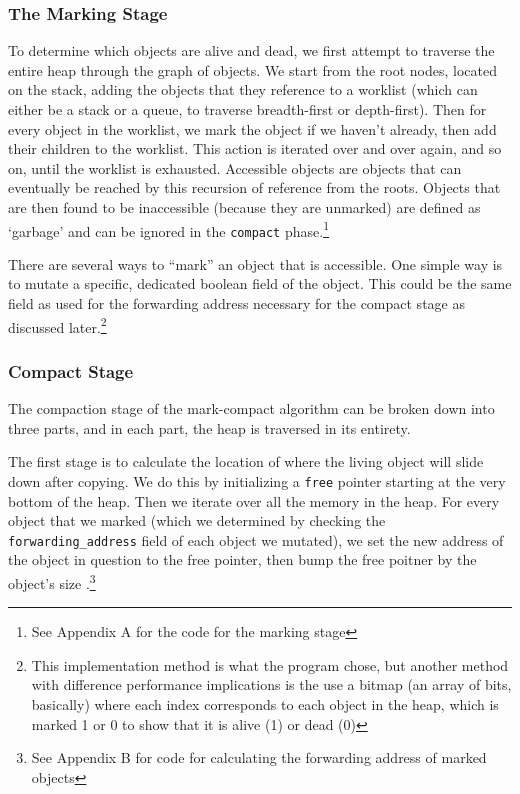\documentclass[index]{subfiles}
\begin{document}
\subsubsection{The Marking Stage}

To determine which objects are alive and dead, we first attempt to traverse the entire heap through the graph of objects. We start from the root nodes, located on the stack\cites[Ch~3~Marking]{redhat_openjdk}[Chapter~3]{gc_handbook}, adding the objects that they reference to a worklist (which can either be a stack or a queue, to traverse breadth-first or depth-first). Then for every object in the worklist, we mark the object if we haven't already, then add their children to the worklist. This action is iterated over and over again, and so on, until the worklist is exhausted. Accessible objects are objects that can eventually be reached by this recursion of reference from the roots. Objects that are then found to be inaccessible (because they are unmarked) are defined as `garbage' and can be ignored in the \verb+compact+ phase.\footnote{See Appendix A for the code for the marking stage}

There are several ways to ``mark'' an object that is accessible\cite[Chapter~3]{gc_handbook}. One simple way is to mutate a specific, dedicated boolean field of the object. This could be the same field as used for the forwarding address necessary for the compact stage as discussed later\cite[Chapter~1]{gc_handbook}.\footnote{This implementation method is what the program chose, but another method with difference performance implications is the use a bitmap (an array of bits, basically) where each index corresponds to each object in the heap, which is marked 1 or 0 to show that it is alive (1) or dead (0)\cite[Chapter~3]{gc_handbook}}

\subsubsection{Compact Stage}

The compaction stage of the mark-compact algorithm can be broken down into three parts, and in each part, the heap is traversed in its entirety.

The first stage is to calculate the location of where the living object will slide down after copying. We do this by initializing a \verb+free+ pointer starting at the very bottom of the heap. Then we iterate over all the memory in the heap. For every object that we marked (which we determined by checking the \verb+forwarding_address+ field of each object we mutated), we set the new address of the object in question to the free pointer, then bump the free poitner by the object's size \cites[Chapter~3]{gc_handbook}[Sections~3.3--3.5]{redhat_openjdk}.\footnote{See Appendix B for code for calculating the forwarding address of marked objects}
\end{document}

